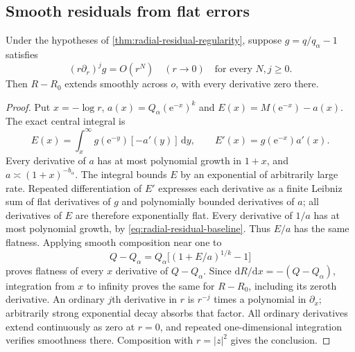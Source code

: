 \subsection{Smooth residuals from flat errors}
\begin{proposition}\label{prop:radial-flat-residual}
Under the hypotheses of \cref{thm:radial-residual-regularity}, suppose
$g=q/q_\alpha-1$ satisfies
\[
 (r\partial_r)^jg=O(r^N)
 \quad(r\to0)\quad\text{for every }N,j\ge0.
\]
Then $R-R_0$ extends smoothly across $o$, with every derivative
zero there.
\end{proposition}
\begin{proof}
Put $x=-\log r$, $a(x)=Q_\alpha(\mathrm{e}^{-x})^k$ and
$E(x)=M(\mathrm{e}^{-x})-a(x)$. The exact central integral is
\[
 E(x)=\int_x^\infty g(\mathrm{e}^{-y})[-a'(y)]\,\mathrm{d}y,
 \qquad E'(x)=g(\mathrm{e}^{-x})a'(x).
\]
Every derivative of $a$ has at most polynomial growth in $1+x$,
and $a\asymp(1+x)^{-b_\alpha}$. The integral bounds $E$ by an
exponential of arbitrarily large rate. Repeated differentiation of
$E'$ expresses each derivative as a finite Leibniz sum of flat
derivatives of $g$ and polynomially bounded derivatives of $a$;
all derivatives of $E$ are therefore exponentially flat.
Every derivative of $1/a$ has at most polynomial growth, by
\eqref{eq:radial-residual-baseline}. Thus $E/a$ has the same flatness. Applying
smooth composition near one to
\[
 Q-Q_\alpha=Q_\alpha\bigl[(1+E/a)^{1/k}-1\bigr]
\]
proves flatness of every $x$ derivative of $Q-Q_\alpha$.
Since $\mathrm{d}R/\mathrm{d}x=-(Q-Q_\alpha)$, integration from $x$ to infinity
proves the same for $R-R_0$, including its zeroth derivative.
An ordinary $j$th derivative in $r$ is $r^{-j}$ times a polynomial
in $\partial_x$; arbitrarily strong exponential decay absorbs that
factor. All ordinary derivatives extend continuously as zero at
$r=0$, and repeated one-dimensional integration verifies smoothness
there. Composition with $r=|z|^2$ gives the conclusion.
\end{proof}

